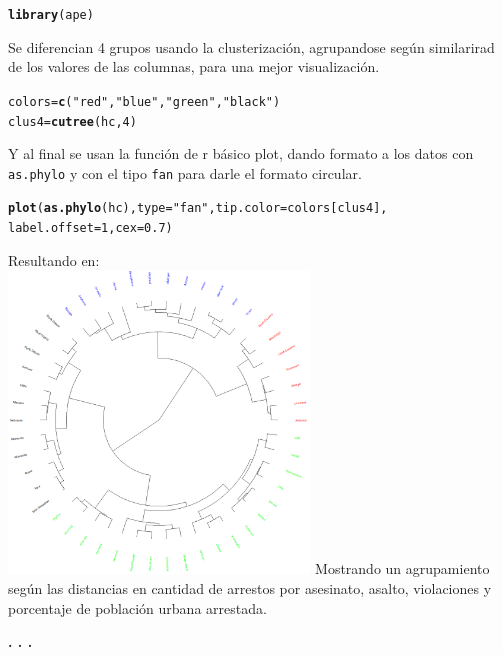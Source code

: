 \documentclass{article}\usepackage[]{graphicx}\usepackage[]{color}
\makeatletter
\newcommand{\hlnum}[1]{\textcolor[rgb]{0.686,0.059,0.569}{#1}}%
\newcommand{\hlstr}[1]{\textcolor[rgb]{0.192,0.494,0.8}{#1}}%
\newcommand{\hlstd}[1]{\textcolor[rgb]{0.345,0.345,0.345}{#1}}%
\newcommand{\hlkwb}[1]{\textcolor[rgb]{0.69,0.353,0.396}{#1}}%
\newcommand{\hlkwc}[1]{\textcolor[rgb]{0.333,0.667,0.333}{#1}}%
\newcommand{\hlkwd}[1]{\textcolor[rgb]{0.737,0.353,0.396}{\textbf{#1}}}%
\newenvironment{kframe}{%
 \def\at@end@of@kframe{}%
 \ifinner\ifhmode%
  \def\at@end@of@kframe{\end{minipage}}%
  \begin{minipage}{\columnwidth}%
 \fi\fi%
 \def\FrameCommand##1{\hskip\@totalleftmargin \hskip-\fboxsep
 \colorbox{shadecolor}{##1}\hskip-\fboxsep
     \hskip-\linewidth \hskip-\@totalleftmargin \hskip\columnwidth}%
 \MakeFramed {\advance\hsize-\width
   \@totalleftmargin\z@ \linewidth\hsize
   \@setminipage}}%
 {\par\unskip\endMakeFramed%
 \at@end@of@kframe}
\newenvironment{knitrout}{}{} %
\makeatother
\begin{document}
\begin{knitrout}
\color{fgcolor}\begin{kframe}
\begin{alltt}
\hlkwd{library}\hlstd{(ape)}
\end{alltt}
\end{kframe}
\end{knitrout}
Se diferencian 4 grupos usando la clusterizaci\'on, agrupandose seg\'un similarirad de los valores de las columnas, para una mejor visualizaci\'on.
\begin{knitrout}
\color{fgcolor}\begin{kframe}
\begin{alltt}
\hlstd{colors} \hlkwb{=} \hlkwd{c}\hlstd{(}\hlstr{"red"}\hlstd{,} \hlstr{"blue"}\hlstd{,} \hlstr{"green"}\hlstd{,} \hlstr{"black"}\hlstd{)}
\hlstd{clus4} \hlkwb{=} \hlkwd{cutree}\hlstd{(hc,} \hlnum{4}\hlstd{)}
\end{alltt}
\end{kframe}
\end{knitrout}
Y al final se usan la funci\'on de r b\'asico plot, dando formato a los datos con \texttt{as.phylo} y con el tipo \texttt{fan} para darle el formato circular.
\begin{knitrout}
\color{fgcolor}\begin{kframe}
\begin{alltt}
\hlkwd{plot}\hlstd{(}\hlkwd{as.phylo}\hlstd{(hc),} \hlkwc{type} \hlstd{=} \hlstr{"fan"}\hlstd{,} \hlkwc{tip.color} \hlstd{= colors[clus4],}
     \hlkwc{label.offset} \hlstd{=} \hlnum{1}\hlstd{,} \hlkwc{cex} \hlstd{=} \hlnum{0.7}\hlstd{)}
\end{alltt}
\end{kframe}
\end{knitrout}
\clearpage
Resultando en:~\\
\vbox{
    \centering
    \includegraphics[width=0.6\textwidth]{imag/ape}
}
Mostrando un agrupamiento seg\'un las distancias en cantidad de arrestos por asesinato, asalto, violaciones y porcentaje de poblaci\'on urbana arrestada.
\begin{center}
\textbf{. . .}
\end{center}
\end{document}
